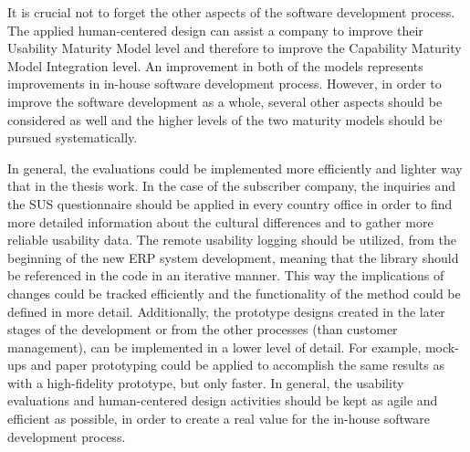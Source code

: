 \documentclass[12pt,a4paper,oneside,pdftex]{report}
\begin{document}
It is crucial not to forget the other aspects of the software development process. The applied human-centered design can assist a company to improve their Usability Maturity Model level and therefore to improve the Capability Maturity Model Integration level. An improvement in both of the models represents improvements in in-house software development process. However, in order to improve the software development as a whole, several other aspects should be considered as well and the higher levels of the two maturity models should be pursued systematically.

In general, the evaluations could be implemented more efficiently and lighter way that in the thesis work. In the case of the subscriber company, the inquiries and the SUS questionnaire should be applied in every country office in order to find more detailed information about the cultural differences and to gather more reliable usability data. The remote usability logging should be utilized, from the beginning of the new ERP system development, meaning that the library should be referenced in the code in an iterative manner. This way the implications of changes could be tracked efficiently and the functionality of the method could be defined in more detail. Additionally, the prototype designs created in the later stages of the development or from the other processes (than customer management), can be implemented in a lower level of detail. For example, mock-ups and paper prototyping could be applied to accomplish the same results as with a high-fidelity prototype, but only faster. In general, the usability evaluations and human-centered design activities should be kept as agile and efficient as possible, in order to create a real value for the in-house software development process.  
 

%
\end{document}
